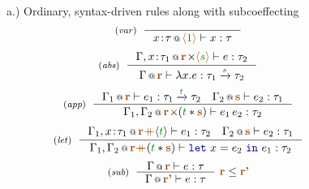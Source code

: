 
\begin{figure}[t]
a.) Ordinary, syntax-driven rules along with subcoeffecting
\begin{equation*}
\tyrule{var}{}
  {\coctx{x \!:\! \tau}{\alift{\cclrd{1}}} \vdash x : \tau}
\end{equation*}
\begin{equation*}
\tyrule{abs}
  {\coctx{\Gamma, x \!:\! \tau_1}{\aclrd{\textbf{r}} \cons \alift{\cclrd{s}}} \vdash e : \tau_2}
  {\coctx{\Gamma}{\aclrd{\textbf{r}}} \vdash \lambda x . e : \tau_1 \xrightarrow{\cclrd{s}} \tau_2}
\end{equation*}
\begin{equation*}
\tyrule{app}
  { \coctx{\Gamma_1}{\aclrd{\textbf{r}}} \vdash e_1 : \tau_1 \xrightarrow{\cclrd{t}} \tau_2 \quad
    \coctx{\Gamma_2}{\aclrd{\textbf{s}}} \vdash e_2 : \tau_1}
  { \coctx{\Gamma_1, \Gamma_2}{\aclrd{\textbf{r}} \cons (\cclrd{t} \ast \aclrd{\textbf{s}})} \vdash e_1 \, e_2 : \tau_2}
\end{equation*}
\begin{equation*}
\tyrule{let}
  { \coctx{\Gamma_1, x \!:\! \tau_1}{\aclrd{\textbf{r}} \atimes \langle{\cclrd{t}}\rangle} \vdash e_1 : \tau_2 \quad
    \coctx{\Gamma_2}{\aclrd{\textbf{s}}} \vdash e_2 : \tau_1}
  {\coctx{\Gamma_1, \Gamma_2}{\aclrd{\textbf{r}} \atimes (\cclrd{t} \ast \aclrd{\textbf{s}})} \vdash \kvd{let}~x=e_2~\kvd{in}~e_1 : \tau_2}
\end{equation*}
\begin{equation*}
\tyrule{sub}
  {\coctx{\Gamma}{\aclrd{\textbf{r}}} \vdash e : \tau}
  {\coctx{\Gamma}{\aclrd{\textbf{r'}}} \vdash e : \tau}~\aclrd{\textbf{r}} \leq \aclrd{\textbf{r'}}
\end{equation*}
\vspace{0.5em}


\end{figure}
